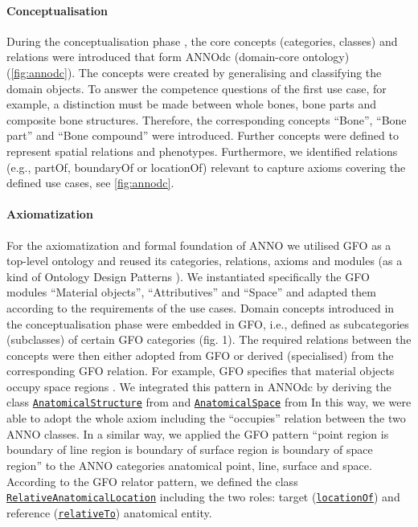 \documentclass[sw]{iosart2x}
\newcommand{\anno}[1]{\href{https://annosaxfdm.de/ontology/#1}{\texttt{#1}}}
\begin{document}
\paragraph{Conceptualisation}
During the conceptualisation phase \citep{herre2010}, the core concepts (categories, classes) and relations were introduced that form ANNOdc (domain-core ontology) (\cref{fig:annodc}).
The concepts were created by generalising and classifying the domain objects.
To answer the competence questions of the first use case, for example, a distinction must be made between whole bones, bone parts and composite bone structures.
Therefore, the corresponding concepts \enquote{Bone}, \enquote{Bone part} and \enquote{Bone compound} were introduced.
Further concepts were defined to represent spatial relations and phenotypes.
Furthermore, we identified relations (e.g., partOf, boundaryOf or locationOf) relevant to capture axioms covering the defined use cases, see \cref{fig:annodc}.

\paragraph{Axiomatization}
For the axiomatization and formal foundation of ANNO we utilised GFO as a top-level ontology and reused its categories, relations, axioms and modules (as a kind of Ontology Design Patterns \citep{ODP2005, XD2016, MOMo2023}).
We instantiated specifically the GFO modules \enquote{Material objects}, \enquote{Attributives} and \enquote{Space} \citep{Burek2020, Loebe2021, Loebe2018} and adapted them according to the requirements of the use cases.
Domain concepts introduced in the conceptualisation phase were embedded in GFO, i.e., defined as subcategories (subclasses) of certain GFO categories (fig. 1).
The required relations between the concepts were then either adopted from GFO or derived (specialised) from the corresponding GFO relation.
For example, GFO specifies that material objects occupy space regions \citep{Loebe2021}.
We integrated this pattern in ANNOdc by deriving the class \anno{AnatomicalStructure} from  and \anno{AnatomicalSpace} from 
In this way, we were able to adopt the whole axiom including the \enquote{occupies} relation between the two ANNO classes.
In a similar way, we applied the GFO pattern \enquote{point region is boundary of line region is boundary of surface region is boundary of space region} \citep{baumann2016} to the ANNO categories anatomical point, line, surface and space.
According to the GFO relator \citep{Loebe2018} pattern, we defined the class \anno{RelativeAnatomicalLocation} including the two roles: target (\anno{locationOf}) and reference (\anno{relativeTo}) anatomical entity. %
\end{document}
